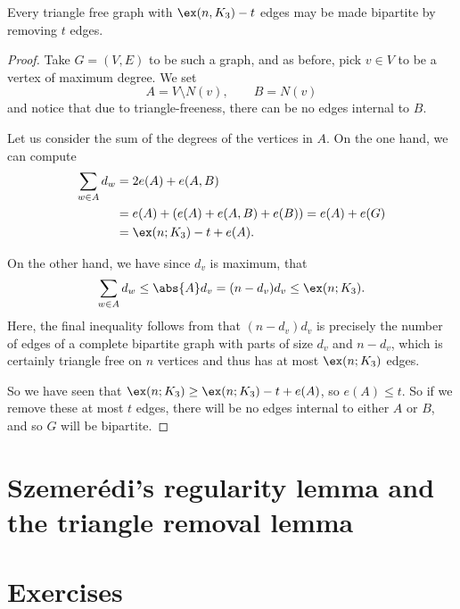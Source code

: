\documentclass[nobib]{tufte-handout}
\begin{document}
\begin{theorem}
    Every triangle free graph with $\ex(n, K_3) - t$ edges may be made bipartite by removing $t$ edges.

    \begin{proof}
        Take $G = (V,E)$ to be such a graph, and as before, pick $v \in V$ to be a vertex of maximum degree. We set
        $$A = V \setminus N(v), \qquad B = N(v)$$
        and notice that due to triangle-freeness, there can be no edges internal to $B$.

        Let us consider the sum of the degrees of the vertices in $A$. On the one hand, we can compute
        \begin{align*}
            \sum_{w \in A} d_w &= 2e(A) + e(A,B)\\
            &= e(A) + \left(e(A) + e(A,B) + e(B)\right) = e(A) + e(G)\\
            &= \ex(n; K_3) - t + e(A).
        \end{align*}

        On the other hand, we have since $d_v$ is maximum, that
        \begin{align*}
            \sum_{w \in A} d_w \leq \abs{A}d_v = (n-d_v)d_v \leq \ex(n; K_3).
        \end{align*}
        Here, the final inequality follows from that $(n-d_v)d_v$ is precisely the number of edges of a complete bipartite graph with parts of size $d_v$ and $n-d_v$, which is certainly triangle free on $n$ vertices and thus has at most $\ex(n; K_3)$ edges.

        So we have seen that $\ex(n; K_3) \geq \ex(n; K_3) - t + e(A)$, so $e(A) \leq t$. So if we remove these at most $t$ edges, there will be no edges internal to either $A$ or $B$, and so $G$ will be bipartite.
    \end{proof}
\end{theorem}

\section{Szemerédi's regularity lemma and the triangle removal lemma}
\section{Exercises}


%
%
\end{document}

